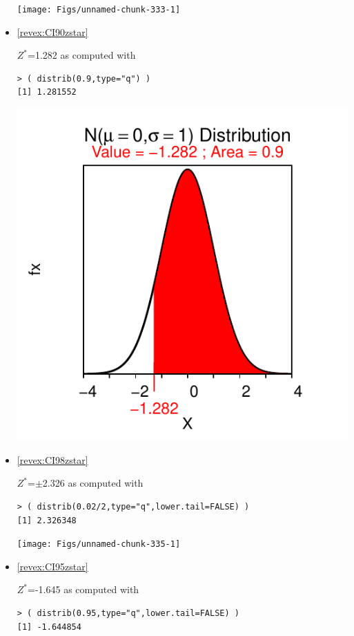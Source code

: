 \documentclass[10pt,openany]{book}\usepackage[]{graphicx}\usepackage[]{color}
\makeatletter
\newenvironment{kframe}{%
 \def\at@end@of@kframe{}%
 \ifinner\ifhmode%
  \def\at@end@of@kframe{\end{minipage}}%
  \begin{minipage}{\columnwidth}%
 \fi\fi%
 \def\FrameCommand##1{\hskip\@totalleftmargin \hskip-\fboxsep
 \colorbox{shadecolor}{##1}\hskip-\fboxsep
     \hskip-\linewidth \hskip-\@totalleftmargin \hskip\columnwidth}%
 \MakeFramed {\advance\hsize-\width
   \@totalleftmargin\z@ \linewidth\hsize
   \@setminipage}}%
 {\par\unskip\endMakeFramed%
 \at@end@of@kframe}
\newenvironment{knitrout}{}{} %
\makeatother
\begin{document}
\begin{itemize}
\begin{knitrout}
{\centering \texttt{[image: Figs/unnamed-chunk-333-1]} 

}



\end{knitrout}
  \item \hypertarget{ans:CI90zstar}{\ref{revex:CI90zstar}} $Z^{*}$=1.282 as computed with
\begin{knitrout}
\color{fgcolor}\begin{kframe}
\begin{verbatim}
> ( distrib(0.9,type="q") )
[1] 1.281552
\end{verbatim}
\end{kframe}

{\centering \includegraphics[width=.4\linewidth]{Figs/unnamed-chunk-334-1} 

}



\end{knitrout}
  \item \hypertarget{ans:CI98zstar}{\ref{revex:CI98zstar}} $Z^{*}$=$\pm$2.326 as computed with
\begin{knitrout}
\color{fgcolor}\begin{kframe}
\begin{verbatim}
> ( distrib(0.02/2,type="q",lower.tail=FALSE) )
[1] 2.326348
\end{verbatim}
\end{kframe}

{\centering \texttt{[image: Figs/unnamed-chunk-335-1]} 

}



\end{knitrout}
  \item \hypertarget{ans:CI95zstar}{\ref{revex:CI95zstar}} $Z^{*}$=-1.645 as computed with
\begin{knitrout}
\color{fgcolor}\begin{kframe}
\begin{verbatim}
> ( distrib(0.95,type="q",lower.tail=FALSE) )
[1] -1.644854
\end{verbatim}
\end{kframe}


\end{knitrout}
\end{itemize}
\end{document}
